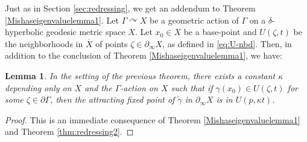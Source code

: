 \documentclass[12pt]{amsbook}%
\newtheorem{lem}[thm]{Lemma}
\theoremstyle{definition}
\theoremstyle{remark}
\numberwithin{section}{chapter}
\numberwithin{subsection}{section}
\numberwithin{figure}{chapter}
\DeclareMathOperator{\acts}{\curvearrowright}
\def\Ga{\Gamma}
\def\geo{\partial_\infty}
\def\ol{\overline}
\def\zhao{\color{red}}
\begin{document}
{{\medskip 
Just as in Section \ref{sec:redressing}, we get an addendum to Theorem \ref{Mishaseigenvaluelemma1}. Let $\Ga\acts X$ be a geometric 
action of $\Ga$ on a $\delta$-hyperbolic geodesic metric space $X$. Let $x_0\in X$  be a base-point and $U(\zeta, t)$ be the neighborhoods in $\ol{X}$ 
of points $\zeta\in \geo X$, as defined in \eqref{eq:U-nbd}. Then, in addition to the conclusion of Theorem \ref{Mishaseigenvaluelemma1}, we have:

\begin{lem}\label{Mishalimitpointslemma4}
In the setting of the previous theorem, there exists a constant $\kappa$ depending only on $X$ and the $\Ga$-action on $X$ such that 
 if $\gamma(x_0)\in U(\zeta,t)$ for some $\zeta \in \partial \Gamma$, then the attracting fixed point of $\tilde{\gamma}$ in $\geo X$ 
 is in $U(p, \kappa t)$. 
\end{lem}
\begin{proof} This is an immediate consequence of Theorem \ref{Mishaseigenvaluelemma1} and Theorem \ref{thm:redressing2}. 
\end{proof}


%
%




}}
\end{document}
